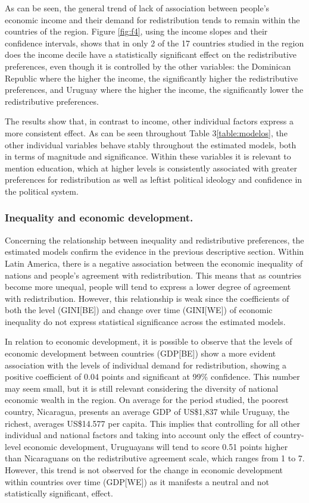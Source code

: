 \documentclass[utf8]{frontiersSCNS} %
\begin{document}
As can be seen, the general trend of lack of association between people’s economic income and their demand for redistribution tends to remain within the countries of the region. Figure \ref{fig:f4}, using the income slopes and their confidence intervals, shows that in only 2 of the 17 countries studied in the region does the income decile have a statistically significant effect on the redistributive preferences, even though it is controlled by the other variables: the Dominican Republic where the higher the income, the significantly higher the redistributive preferences, and Uruguay where the higher the income, the significantly lower the redistributive preferences.

The results show that, in contrast to income, other individual factors express a more consistent effect. As can be seen throughout Table 3\ref{table:modelos}, the other individual variables behave stably throughout the estimated models, both in terms of magnitude and significance. Within these variables it is relevant to mention education, which at higher levels is consistently associated with greater preferences for redistribution as well as leftist political ideology and confidence in the political system.

\subsubsection{Inequality and economic development.}

Concerning the relationship between inequality and redistributive preferences, the estimated models confirm the evidence in the previous descriptive section. Within Latin America, there is a negative association between the economic inequality of nations and people’s agreement with redistribution. This means that as countries become more unequal, people will tend to express a lower degree of agreement with redistribution. However, this relationship is weak since the coefficients of both the level (GINI[BE]) and change over time (GINI[WE]) of economic inequality do not express statistical significance across the estimated models.

In relation to economic development, it is possible to observe that the levels of economic development between countries (GDP[BE]) show a more evident association with the levels of individual demand for redistribution, showing a positive coefficient of 0.04 points and significant at 99\% confidence. This number may seem small, but it is still relevant considering the diversity of national economic wealth in the region. On average for the period studied, the poorest country, Nicaragua, presents an average GDP of US\$1,837 while Uruguay, the richest, averages US\$14.577 per capita. This implies that controlling for all other individual and national factors and taking into account only the effect of country-level economic development, Uruguayans will tend to score 0.51 points higher than Nicaraguans on the redistributive agreement scale, which ranges from 1 to 7. However, this trend is not observed for the change in economic development within countries over time (GDP[WE]) as it manifests a neutral and not statistically significant, effect.
\end{document}
